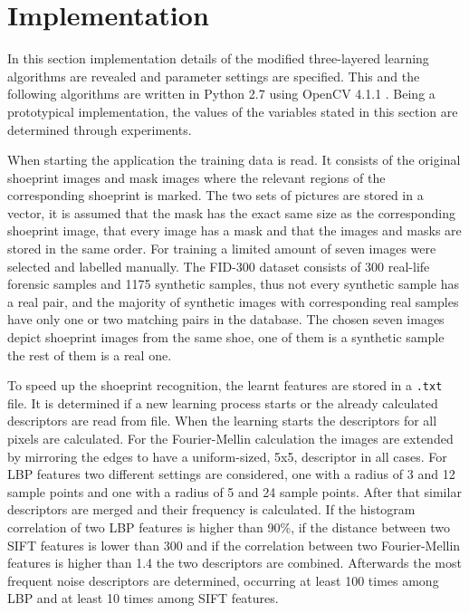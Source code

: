 \documentclass[draft,final]{vutinfth} %
\begin{document}
\section{Implementation}
\par
In this section implementation details of the modified three-layered learning algorithms are revealed and parameter settings are specified.
This and the following algorithms are written in Python 2.7 \cite{van1995python} using OpenCV 4.1.1 \cite{opencv_library}.
Being a prototypical implementation, the values of the variables stated in this section are determined through experiments.
\par
When starting the application the training data is read.
It consists of the original shoeprint images and mask images where the relevant regions of the corresponding shoeprint is marked.
The two sets of pictures are stored in a vector, it is assumed that the mask has the exact same size as the corresponding shoeprint image, that every image has a mask and that the images and masks are stored in the same order.
For training a limited amount of seven images were selected and labelled manually.
The FID-300 \cite{kortylewski2014unsupervised} dataset consists of 300 real-life forensic samples and 1175 synthetic samples, thus not every synthetic sample has a real pair, and the majority of synthetic images with corresponding real samples have only one or two matching pairs in the database.
The chosen seven images depict shoeprint images from the same shoe, one of them is a synthetic sample the rest of them is a real one.
\par
To speed up the shoeprint recognition, the learnt features are stored in a \texttt{.txt} file.
It is determined if a new learning process starts or the already calculated descriptors are read from file.
When the learning starts the descriptors for all pixels are calculated.
For the Fourier-Mellin calculation the images are extended by mirroring the edges to have a uniform-sized, 5x5, descriptor in all cases.
For LBP features two different settings are considered, one with a radius of 3 and 12 sample points and one with a radius of 5 and 24 sample points.
After that similar descriptors are merged and their frequency is calculated.
If the histogram correlation of two LBP features is higher than 90\%, if the distance between two SIFT features is lower than 300 and if the correlation between two Fourier-Mellin features is higher than 1.4 the two descriptors are combined.
Afterwards the most frequent noise descriptors are determined, occurring at least 100 times among LBP and at least 10 times among SIFT features.
\end{document}

